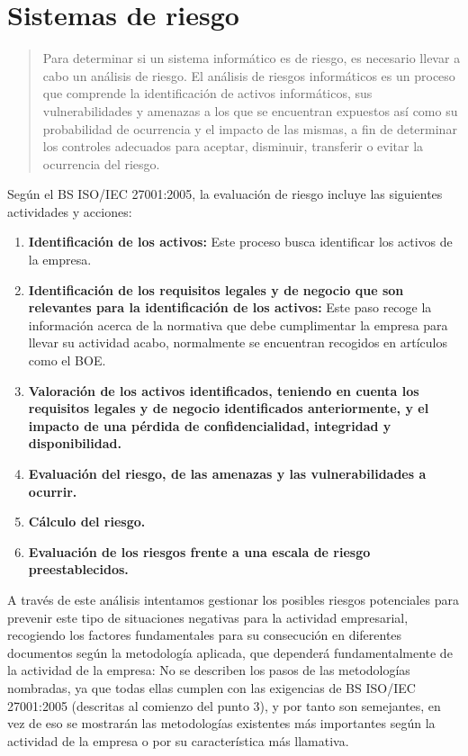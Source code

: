 \chapter{Sistemas de riesgo}
\label{cha:sistemas-de-riesgo}
\begin{quote}
Para determinar si un sistema informático es de riesgo, es necesario llevar a cabo un análisis de riesgo.
El análisis de riesgos informáticos es un proceso que comprende la identificación de activos informáticos, sus vulnerabilidades y amenazas a los que se encuentran expuestos así como su probabilidad de ocurrencia y el impacto de las mismas, a fin de determinar los controles adecuados para aceptar, disminuir, transferir o evitar la ocurrencia del riesgo.\cite{wikip} 
\end{quote}

Según el BS ISO/IEC 27001:2005, la evaluación de riesgo incluye las siguientes actividades y acciones:
\begin{enumerate}
\item {\bfseries Identificación de los activos:}
Este proceso busca identificar los activos de la empresa.
\item {\bfseries Identificación de los requisitos legales y de negocio que son relevantes para la identificación de los activos:}
Este paso recoge la información acerca de la normativa que debe cumplimentar la empresa para llevar su actividad acabo, normalmente se encuentran recogidos en artículos como el BOE.
\item {\bfseries Valoración de los activos identificados, teniendo en cuenta los requisitos legales y de negocio identificados anteriormente, y el impacto de una pérdida de confidencialidad, integridad y disponibilidad.}
\item {\bfseries Evaluación del riesgo, de las amenazas y las vulnerabilidades a ocurrir.}
\item {\bfseries Cálculo del riesgo. }
\item {\bfseries Evaluación de los riesgos frente a una escala de riesgo preestablecidos.}
\end{enumerate}

A través de este análisis intentamos gestionar los posibles riesgos potenciales para prevenir este tipo de situaciones negativas para la actividad empresarial, recogiendo los factores fundamentales para su consecución en diferentes documentos según la metodología aplicada, que dependerá fundamentalmente de la actividad de la empresa:
No se describen los pasos de las metodologías nombradas, ya que todas ellas cumplen con las exigencias de BS ISO/IEC 27001:2005 (descritas al comienzo del punto 3), y por tanto son semejantes, en vez de eso se mostrarán las metodologías existentes más importantes según la actividad de la empresa o por su característica más llamativa.


